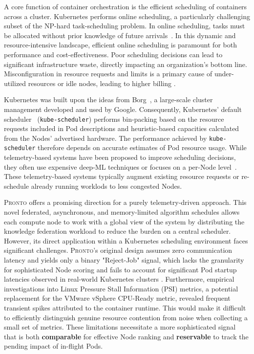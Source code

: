 A core function of container orchestration is the efficient scheduling of
containers across a cluster. Kubernetes performs online scheduling, a
particularly challenging subset of the NP-hard task-scheduling problem. In
online scheduling, tasks must be allocated without prior knowledge of future
arrivals~\cite{pruhs2004online}. In this dynamic and resource-intensive
landscape, efficient online scheduling is paramount for both performance and
cost-effectiveness. Poor scheduling decisions can lead to significant
infrastructure waste, directly impacting an organization's bottom line.
Misconfiguration in resource requests and limits is a primary cause of
under-utilized resources or idle nodes, leading to higher billing
\cite{cost-strategies,
bin-packing-and-cost-savings-in-kubernetes-clusters-on-aws}.

Kubernetes was built upon the ideas from Borg~\cite{}, a large-scale cluster
management developed and used by Google. Consequently, Kubernetes' default
scheduler~\cite{kube-scheduler} (\texttt{kube-scheduler}) performs bin-packing
based on the resource requests included in Pod descriptions and heuristic-based
capacities calculated from the Nodes' advertised hardware. The performance
achieved by \texttt{kube-scheduler} therefore depends on accurate estimates of
Pod resource usage. While telemetry-based systems have been proposed to improve
scheduling decisions, they often use expensive deep-ML techniques
\cite{bao2019deep, peng2021dl2} or focuses on a per-Node
level~\cite{yang2019design}. These telemetry-based systems typically augment
existing resource requests or re-schedule already running worklods to less
congested Nodes.

\textsc{Pronto} \cite{grammenos_pronto_2021} offers a promising direction for a
purely telemetry-driven approach. This novel federated, asynchronous, and
memory-limited algorithm schedules allows each compute node to work with a
global view of the system by distributing the knowledge federation workload to
reduce the burden on a central scheduler. However, its direct application within
a Kubernetes scheduling
environment faces significant challenges. \textsc{Pronto}'s original design
assumes zero communication latency and yields only a binary "Reject-Job" signal,
which lacks the granularity for sophisticated Node scoring and fails to account
for significant Pod startup latencies observed in real-world Kubernetes clusters
\cite{qadeer_scaling_2022}. Furthermore, empirical investigations into Linux
Pressure Stall Information (PSI) metrics, a potential replacement for the VMware
vSphere CPU-Ready metric, revealed frequent transient spikes attributed to the
container runtime. This would make it difficult to efficiently distinguish
genuine resource contention from noise when collecting a small set of metrics.
These limitations necessitate a more sophisticated signal that is both
\textbf{comparable} for effective Node ranking and \textbf{reservable} to track
the pending impact of in-flight Pods.

